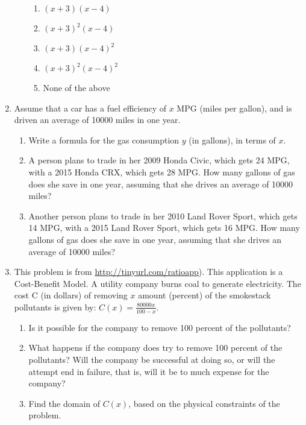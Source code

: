 \documentclass[11pt]{article}
\begin{document}
\begin{enumerate}
\begin{minipage}[b]{0.5\linewidth}
\begin{enumerate}
\begin{enumerate}
\item $\displaystyle (x+3)(x-4)$
\item $\displaystyle (x+3)^2(x-4)$
\item $\displaystyle (x+3)(x-4)^2$
\item $\displaystyle (x+3)^2(x-4)^2$
\item None of the above
\end{enumerate}

\end{enumerate}
\end{minipage}


\item Assume that a car  has a fuel efficiency of $x$ MPG (miles per gallon), and is driven an average of 10000 miles in one year.

\begin{enumerate}
\item Write a formula for the gas consumption $y$ (in gallons), in terms of $x$.
\item A person plans to trade in her 2009 Honda Civic, which gets 24 MPG, with a 2015 Honda CRX, which gets 28 MPG. How many gallons of gas does she save in one year, assuming that she drives an average of 10000 miles?
\item Another person plans to trade in her 2010 Land Rover Sport, which gets 14 MPG, with a 2015 Land Rover Sport, which gets 16 MPG. How many gallons of gas does she save in one year, assuming that she drives an average of 10000 miles?
\end{enumerate}

\item This problem is from \url{http://tinyurl.com/ratioapp}). 
This application is a Cost-Benefit Model.  A utility company burns coal to generate electricity.  The cost C (in dollars) of removing $x$ amount (percent) of the smokestack pollutants is given by: $\displaystyle C(x)=\frac{80000x}{100-x}$.
\begin{enumerate}
\item Is it possible for the company to remove 100 percent of the pollutants?  
\item What happens if the company does try to remove 100 percent of the pollutants?  Will the company be successful at doing so, or will the attempt end in failure, that is, will it be to much expense for the company?  
\item Find the domain of $C(x)$, based on the physical constraints of the problem.
\end{enumerate}

\end{enumerate}
\end{document}

